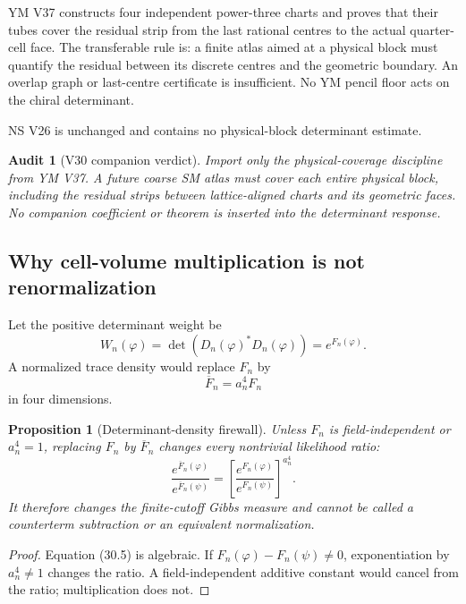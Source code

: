 \documentclass[11pt]{article}
\newtheorem{proposition}[theorem]{Proposition}
\newtheorem{audit}[theorem]{Audit}
\theoremstyle{remark}
\begin{document}
YM V37 constructs four independent power-three charts and proves
that their tubes cover the residual strip from the last rational
centres to the actual quarter-cell face.  The transferable rule is:
a finite atlas aimed at a physical block must quantify the residual
between its discrete centres and the geometric boundary.  An
overlap graph or last-centre certificate is insufficient.  No YM
pencil floor acts on the chiral determinant.

NS V26 is unchanged and contains no physical-block determinant
estimate.

\begin{audit}[V30 companion verdict]
\label{aud:v15v30-verdict}
Import only the physical-coverage discipline from YM V37.  A future
coarse SM atlas must cover each entire physical block, including
the residual strips between lattice-aligned charts and its geometric
faces.  No companion coefficient or theorem is inserted into the
determinant response.
\end{audit}

\subsection{Why cell-volume multiplication is not renormalization}

Let the positive determinant weight be
\[
 W_n(\varphi)
 =
 \det(D_n(\varphi)^*D_n(\varphi))
 =
 e^{F_n(\varphi)}.                                         \tag{30.3}
\]
A normalized trace density would replace \(F_n\) by
\[
 \overline F_n=a_n^4F_n                                    \tag{30.4}
\]
in four dimensions.

\begin{proposition}[Determinant-density firewall]
\label{prop:v15v30-firewall}
Unless \(F_n\) is field-independent or \(a_n^4=1\), replacing
\(F_n\) by \(\overline F_n\) changes every nontrivial likelihood
ratio:
\[
 \frac{e^{\overline F_n(\varphi)}}{e^{\overline F_n(\psi)}}
 =
 \left[
 \frac{e^{F_n(\varphi)}}{e^{F_n(\psi)}}
 \right]^{a_n^4}.                                         \tag{30.5}
\]
It therefore changes the finite-cutoff Gibbs measure and cannot be
called a counterterm subtraction or an equivalent normalization.
\end{proposition}

\begin{proof}
Equation (30.5) is algebraic.  If
\(F_n(\varphi)-F_n(\psi)\ne0\), exponentiation by \(a_n^4\ne1\)
changes the ratio.  A field-independent additive constant would
cancel from the ratio; multiplication does not.
\end{proof}
\end{document}

